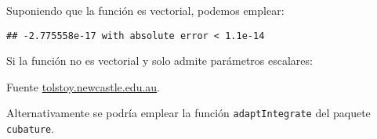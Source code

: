 \documentclass[
]{book}
\newenvironment{Shaded}{\begin{snugshade}}{\end{snugshade}}
\newcommand{\ControlFlowTok}[1]{\textcolor[rgb]{0.13,0.29,0.53}{\textbf{#1}}}
\newcommand{\KeywordTok}[1]{\textcolor[rgb]{0.13,0.29,0.53}{\textbf{#1}}}
\newcommand{\NormalTok}[1]{#1}
\newcommand{\OperatorTok}[1]{\textcolor[rgb]{0.81,0.36,0.00}{\textbf{#1}}}
\theoremstyle{break}
\theoremstyle{definition}
\theoremstyle{definition}
\theoremstyle{definition}
\theoremstyle{remark}
\begin{document}
Suponiendo que la función es vectorial, podemos emplear:

\begin{Shaded}
\end{Shaded}

\begin{verbatim}
## -2.775558e-17 with absolute error < 1.1e-14
\end{verbatim}

Si la función no es vectorial y solo admite parámetros escalares:

\begin{Shaded}
\end{Shaded}

Fuente \href{http://tolstoy.newcastle.edu.au/R/help/04/10/5951.html}{tolstoy.newcastle.edu.au}.

Alternativamente se podría emplear la función \texttt{adaptIntegrate} del paquete \texttt{cubature}.

  
\end{document}
